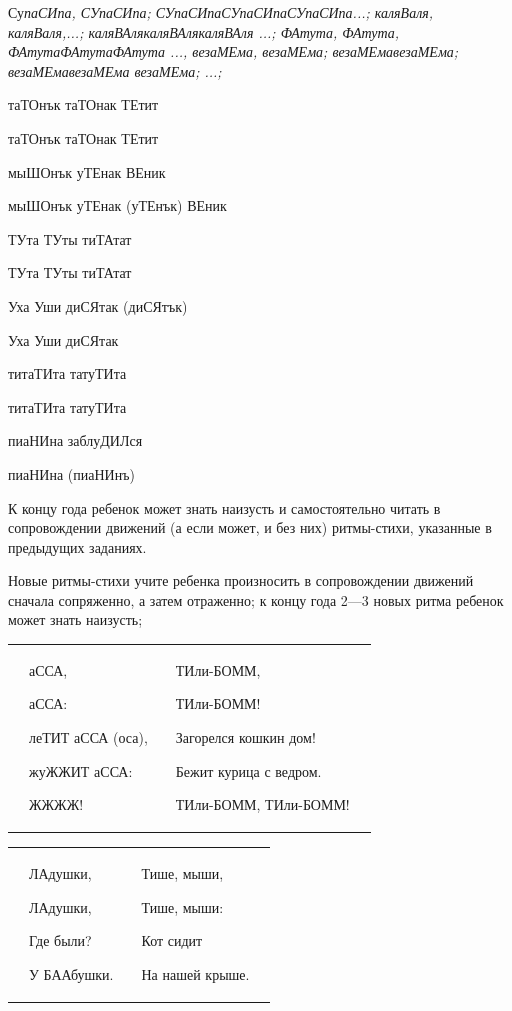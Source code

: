 \documentclass[a5paper]{book}
\renewcommand{\emph}[1]{\textit{#1}}
\begin{document}
Су\emph{паСИпа, СУпаСИпа; СУпаСИпаСУпаСИпаСУпаСИпа...; каляВаля,
каляВаля,...; каляВАлякаляВАлякаляВАля ...; ФАтута, ФАтута,
ФАтутаФАтутаФАтута ..., везаМЕма, везаМЕма; везаМЕмавезаМЕма;
везаМЕмавезаМЕма везаМЕма; ...;}

таТОнък таТОнак ТЕтит

таТОнък таТОнак ТЕтит

мыШОнък уТЕнак ВЕник

мыШОнък уТЕнак (уТЕнък) ВЕник

ТУта ТУты тиТАтат

ТУта ТУты тиТАтат

Уха Уши диСЯтак (диСЯтък)

Уха Уши диСЯтак

титаТИта татуТИта

титаТИта татуТИта

пиаНИна заблуДИЛся

пиаНИна (пиаНИнъ)

К концу года ребенок может знать наизусть и самостоятельно читать в
сопровождении движений (а если может, и без них) ритмы-стихи, указанные
в предыдущих заданиях.

Новые ритмы-стихи учите ребенка произносить в сопровождении движений
сначала сопряженно, а затем отраженно; к концу года 2---3 новых ритма
ребенок может знать наизусть;
{ \centering
\begin{tabular}{p{}p{}p{}p{}p{}}
&аССА, 

аССА: 

леТИТ аССА (оса),

жуЖЖИТ аССА:

ЖЖЖЖ! &&

ТИли-БОММ,

ТИли-БОММ!

Загорелся кошкин дом!

Бежит курица с ведром.

ТИли-БОММ, ТИли-БОММ!&
\end{tabular}
}

{ \centering
\begin{tabular}{p{}p{}p{}p{}p{}}&
ЛАдушки,

ЛАдушки,

Где были?

У БААбушки.&&

Тише, мыши,

Тише, мыши:
 
Кот сидит

На нашей крыше.&
\end{tabular}
}
\end{document}
